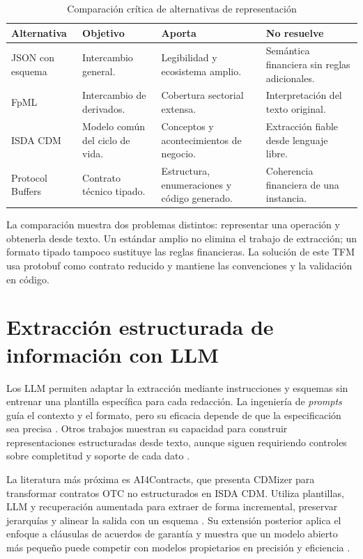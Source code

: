 \begin{table}[H]
\centering
\small
\caption{Comparación crítica de alternativas de representación}
\label{tab:formatos_estado_arte}
\begin{tabular}{|P{2.6cm}|P{3.6cm}|P{3.4cm}|P{3.6cm}|}
\hline
\textbf{Alternativa} & \textbf{Objetivo} & \textbf{Aporta} & \textbf{No resuelve} \\
\hline
JSON con esquema & Intercambio general. & Legibilidad y ecosistema amplio. & Semántica financiera sin reglas adicionales. \\
\hline
FpML & Intercambio de derivados. & Cobertura sectorial extensa. & Interpretación del texto original. \\
\hline
ISDA CDM & Modelo común del ciclo de vida. & Conceptos y acontecimientos de negocio. & Extracción fiable desde lenguaje libre. \\
\hline
Protocol Buffers & Contrato técnico tipado. & Estructura, enumeraciones y código generado. & Coherencia financiera de una instancia. \\
\hline
\end{tabular}
\end{table}

La comparación muestra dos problemas distintos: representar una operación y obtenerla desde texto. Un estándar amplio no elimina el trabajo de extracción; un formato tipado tampoco sustituye las reglas financieras. La solución de este TFM usa protobuf como contrato reducido y mantiene las convenciones y la validación en código.

\section{Extracción estructurada de información con LLM}
\label{sec:extraccion_estructurada_llm}

Los LLM permiten adaptar la extracción mediante instrucciones y esquemas sin entrenar una plantilla específica para cada redacción. La ingeniería de \textit{prompts} guía el contexto y el formato, pero su eficacia depende de que la especificación sea precisa \citep{sahoo2024promptengineering}. Otros trabajos muestran su capacidad para construir representaciones estructuradas desde texto, aunque siguen requiriendo controles sobre completitud y soporte de cada dato \citep{roychoudhury2024gpt3ie,bechard2024structuredrag}.

La literatura más próxima es AI4Contracts, que presenta CDMizer para transformar contratos OTC no estructurados en ISDA CDM. Utiliza plantillas, LLM y recuperación aumentada para extraer de forma incremental, preservar jerarquías y alinear la salida con un esquema \citep{mridul2025ai4contracts}. Su extensión posterior aplica el enfoque a cláusulas de acuerdos de garantía y muestra que un modelo abierto más pequeño puede competir con modelos propietarios en precisión y eficiencia \citep{mridul2025resourceefficient}.


